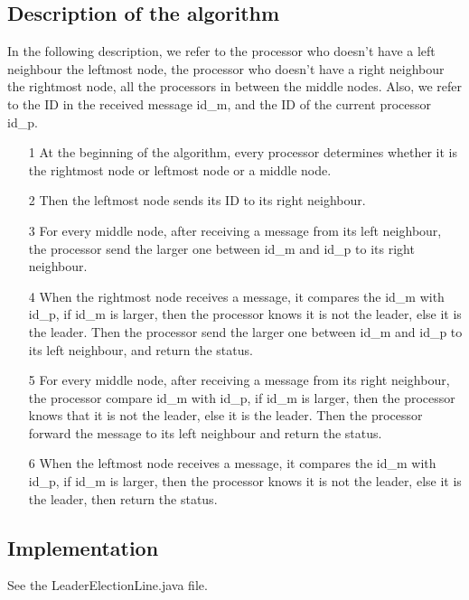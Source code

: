 \documentclass[paper=a4, fontsize=11pt]{scrartcl} %
\numberwithin{equation}{section} %
\numberwithin{figure}{section} %
\numberwithin{table}{section} %
\begin{document}
\subsection*{Description of the algorithm}
In the following description, we refer to the processor who doesn't have a left neighbour the leftmost node, the processor who doesn't have a right neighbour the rightmost node, all the processors in between the middle nodes. Also, we refer to the ID in the received message id\_m, and the ID of the current processor id\_p.
\begin{itemize}
	\item[1] At the beginning of the algorithm, every processor determines whether it is the rightmost node or leftmost node or a middle node.

	\item[2] Then the leftmost node sends its ID to its right neighbour.

	\item[3] For every middle node, after receiving a message from its left neighbour, the processor send the larger one between id\_m and id\_p to its right neighbour.
	\item[4] When the rightmost node receives a message, it compares the id\_m with id\_p, if id\_m is larger, then the processor knows it is not the leader, else it is the leader. Then the processor send the larger one between id\_m and id\_p to its left neighbour, and return the status.
	\item[5] For every middle node, after receiving a message from its right neighbour, the processor compare id\_m with id\_p, if id\_m is larger, then the processor knows that it is not the leader, else it is the leader. Then the processor forward the message to its left neighbour and return the status.
	\item[6] When the leftmost node receives a message, it compares the id\_m with id\_p, if id\_m is larger, then the processor knows it is not the leader, else it is the leader, then return the status.
\end{itemize}
\subsection*{Implementation}
See the LeaderElectionLine.java file.
\end{document}

